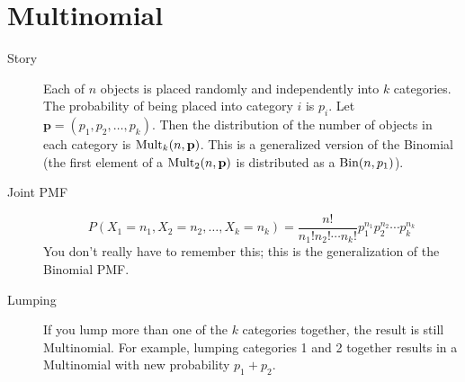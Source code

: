 \documentclass{article}
\begin{document}
\section{Multinomial}

\begin{description}

\item[Story] Each of $n$ objects is placed randomly and independently into $k$ categories. The probability of being placed into category $i$ is $p_i$. Let $\mathbf{p} = (p_1, p_2, \dots, p_k)$. Then the distribution of the number of objects in each category is $\textrm{Mult}_k(n, \mathbf{p})$. This is a generalized version of the Binomial (the first element of a $\textrm{Mult}_2(n, \mathbf{p})$ is distributed as a $\textrm{Bin}(n, p_1)$).

\item[Joint PMF] $$P(X_1 = n_1, X_2 = n_2, \dots, X_k = n_k) = \frac{n!}{n_1!n_2!\cdots n_k!}p_1^{n_1}p_2^{n_2}\cdots p_k^{n_k}$$ You don't really have to remember this; this is the generalization of the Binomial PMF.

\item[Lumping] If you lump more than one of the $k$ categories together, the result is still Multinomial. For example, lumping categories 1 and 2 together results in a Multinomial with new probability $p_1 + p_2$.

\end{description}
\end{document}
